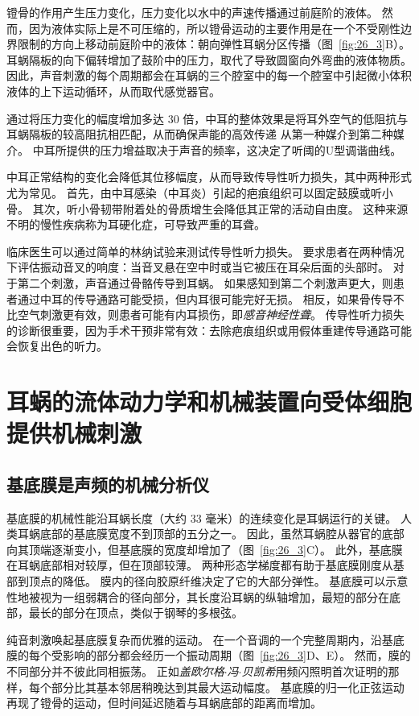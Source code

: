 镫骨的作用产生压力变化，压力变化以水中的声速传播通过前庭阶的液体。
然而，因为液体实际上是不可压缩的，所以镫骨运动的主要作用是在一个不受刚性边界限制的方向上移动前庭阶中的液体：朝向弹性耳蜗分区传播（图~\ref{fig:26_3}B）。
耳蜗隔板的向下偏转增加了鼓阶中的压力，取代了导致圆窗向外弯曲的液体物质。
因此，声音刺激的每个周期都会在耳蜗的三个腔室中的每一个腔室中引起微小体积液体的上下运动循环，从而取代感觉器官。


通过将压力变化的幅度增加多达 30 倍，中耳的整体效果是将耳外空气的低阻抗与耳蜗隔板的较高阻抗相匹配，从而确保声能的高效传递 从第一种媒介到第二种媒介。
中耳所提供的压力增益取决于声音的频率，这决定了听阈的U型调谐曲线。


中耳正常结构的变化会降低其位移幅度，从而导致传导性听力损失，其中两种形式尤为常见。
首先，由中耳感染（中耳炎）引起的疤痕组织可以固定鼓膜或听小骨。
其次，听小骨韧带附着处的骨质增生会降低其正常的活动自由度。
这种来源不明的慢性疾病称为耳硬化症，可导致严重的耳聋。


临床医生可以通过简单的林纳试验来测试传导性听力损失。
要求患者在两种情况下评估振动音叉的响度：当音叉悬在空中时或当它被压在耳朵后面的头部时。
对于第二个刺激，声音通过骨骼传导到耳蜗。
如果感知到第二个刺激声更大，则患者通过中耳的传导通路可能受损，但内耳很可能完好无损。
相反，如果骨传导不比空气刺激更有效，则患者可能有内耳损伤，即\textit{感音神经性聋}。
传导性听力损失的诊断很重要，因为手术干预非常有效：去除疤痕组织或用假体重建传导通路可能会恢复出色的听力。



\section{耳蜗的流体动力学和机械装置向受体细胞提供机械刺激}

\subsection{基底膜是声频的机械分析仪}

基底膜的机械性能沿耳蜗长度（大约 33 毫米）的连续变化是耳蜗运行的关键。
人类耳蜗底部的基底膜宽度不到顶部的五分之一。
因此，虽然耳蜗腔从器官的底部向其顶端逐渐变小，但基底膜的宽度却增加了（图~\ref{fig:26_3}C）。
此外，基底膜在耳蜗底部相对较厚，但在顶部较薄。
两种形态学梯度都有助于基底膜刚度从基部到顶点的降低。
膜内的径向胶原纤维决定了它的大部分弹性。
基底膜可以示意性地被视为一组弱耦合的径向部分，其长度沿耳蜗的纵轴增加，最短的部分在底部，最长的部分在顶点，类似于钢琴的多根弦。


纯音刺激唤起基底膜复杂而优雅的运动。
在一个音调的一个完整周期内，沿基底膜的每个受影响的部分都会经历一个振动周期（图~\ref{fig:26_3}D、E）。
然而，膜的不同部分并不彼此同相振荡。
正如\textit{盖欧尔格$\cdot$冯$\cdot$贝凯希}用频闪照明首次证明的那样，每个部分比其基本邻居稍晚达到其最大运动幅度。
基底膜的归一化正弦运动再现了镫骨的运动，但时间延迟随着与耳蜗底部的距离而增加。


